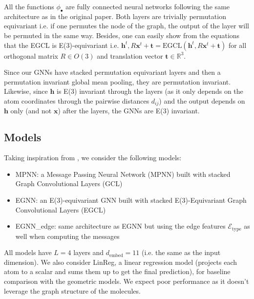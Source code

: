 \documentclass[sigconf]{acmart}
\begin{document}
All the functions $\phi_\bullet$ are fully connected neural networks following the same architecture as in the original paper.
Both layers are trivially permutation equivariant i.e. if one permutes the node of the graph, the output of the layer will be permuted in the same way.
Besides, one can easily show from the equations that the EGCL is E(3)-equivariant i.e. $\mathbf{h}^t, R\mathbf{x}^t + \mathbf{t} = \text{EGCL}(\mathbf{h}^t, R\mathbf{x}^t + \mathbf{t})$ for all orthogonal matrix $R\in O(3)$ and translation vector $\mathbf{t} \in \mathbb{R}^3$.

Since our GNNs have stacked permutation equivariant layers and then a permutation invariant global mean pooling, they are permutation invariant.
Likewise, since $\mathbf{h}$ is E(3) invariant through the layers (as it only depends on the atom coordinates through the pairwise distances $d_{ij}$) and the output depends on $\mathbf{h}$ only (and not $\mathbf{x}$) after the layers, the GNNs are E(3) invariant.

\subsection{Models}

Taking inspiration from \cite{gnn-101}, we consider the following models:
\begin{itemize}
    \item MPNN: a Message Passing Neural Network (MPNN) built with stacked Graph Convolutional Layers (GCL)
    \item EGNN: an E(3)-equivariant GNN built with stacked E(3)-Equivariant Graph Convolutional Layers (EGCL)
    \item EGNN\_edge: same architecture as EGNN but using the edge features $\mathcal{E}_\text{type}$ as well when computing the messages
\end{itemize}
All models have $L=4$ layers and $d_\text{embed}=11$ (i.e. the same as the input dimension).
We also consider LinReg, a linear regression model (projects each atom to a scalar and sums them up to get the final prediction), for baseline comparison with the geometric models.
We expect poor performance as it doesn't leverage the graph structure of the molecules.
\end{document}
